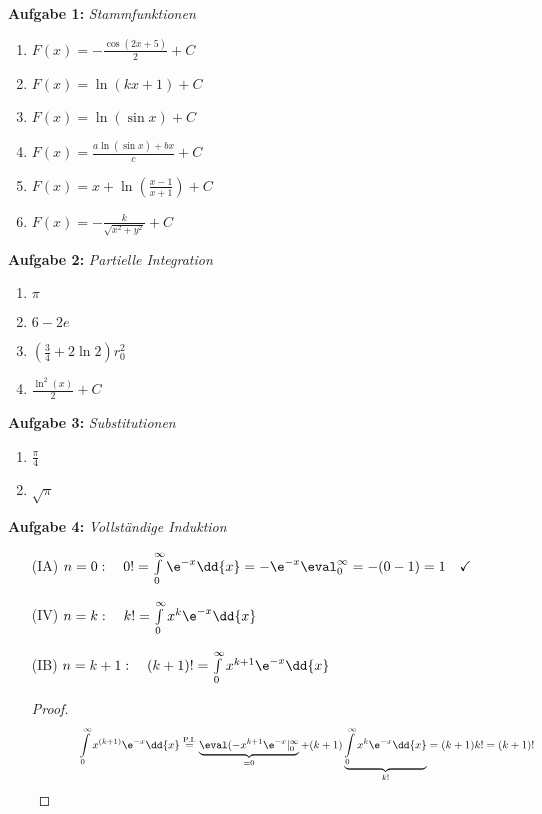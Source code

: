 
\textbf{Aufgabe 1: } \emph{Stammfunktionen}
\begin{enumerate}[label=(\alph*)]
\item $F(x)=-\frac{\cos(2x+5)}{2}+C$
\item $F(x)=\ln(kx+1)+C$
\item $F(x)=\ln(\sin x)+C$
\item $F(x)=\frac{a\ln(\sin x)+bx}{c}+C$
\item $F(x)=x+\ln\left(\frac{x-1}{x+1}\right)+C$
\item $F(x)=-\frac{k}{\sqrt{x^2+y^2}}+C$
\end{enumerate}
\vspace{0.4cm}
%
\textbf{Aufgabe 2: } \emph{Partielle Integration}
\begin{enumerate}[label=(\alph*)]
\item $\pi$
\item $6-2e$
\item $\left(\frac{3}{4}+2\ln 2\right)r_0^2$
\item $\frac{\ln^2(x)}{2}+C$
\end{enumerate}
\vspace{0.4cm}
%
\textbf{Aufgabe 3: } \emph{Substitutionen}
\begin{enumerate}[label=(\alph*)]
\item $\frac{\pi}{4}$
\item $\sqrt{\pi}$
\end{enumerate}\vspace{0.5cm}
%
\textbf{Aufgabe 4: } \emph{Vollständige Induktion}\\[0.2cm]
\begin{enumerate}
    \setlength{\mathindent}{0cm}
    \item[(IA)] $n=0: \quad 0! = \int\limits_{0}^{\infty} \e^{-x} \dd{x} = -\e^{-x}\eval_0^\infty = -(0-1) = 1 \quad\checkmark$ 
    \item[(IV)] $n=k: \quad k! = \int\limits_{0}^{\infty} x^k \e^{-x} \dd{x}$
    \item[(IB)] $n=k+1: \quad (k+1)! = \int\limits_{0}^{\infty} x^{k+1} \e^{-x} \dd{x}$\\
    \begin{proof}$~$\\[-1.8cm]
        \begin{align}
            \hspace{1.5cm} \int\limits_{0}^{\infty} x^{(k+1)} \e^{-x} \dd{x} \overset{\text{P.I.}}{=} \underbrace{\eval(-x^{k+1} \e^{-x}|_0^\infty}_{=0} + (k+1) \underbrace{\int\limits_{0}^{\infty} x^k \e^{-x} \dd{x}}_{k!} = (k+1)k! = (k+1)!
        \end{align}
    \end{proof}
\end{enumerate}

